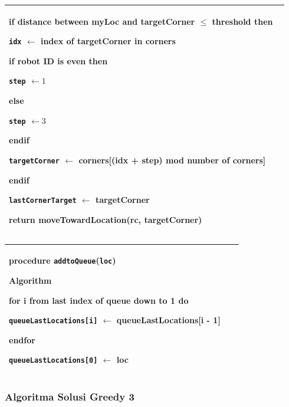 \documentclass{article}
\newenvironment{pseudobox}
{
\centering
\begin{longtable}{|p{0.94\linewidth}|}
\hline
}
{
\\ \hline
\end{longtable}
\vspace{0.05cm}
}
\begin{document}
\begin{enumerate}[label=\alph*.]
\begin{pseudobox}
\hspace*{1.5em}if distance between myLoc and targetCorner $\leq$ threshold then

\hspace*{3em}\texttt{idx} $\leftarrow$ index of targetCorner in corners

\hspace*{3em}if robot ID is even then

\hspace*{4.5em}\texttt{step} $\leftarrow 1$

\hspace*{3em}else

\hspace*{4.5em}\texttt{step} $\leftarrow 3$

\hspace*{3em}endif

\hspace*{3em}\texttt{targetCorner} $\leftarrow$ corners[(idx + step) mod number of corners]

\hspace*{1.5em}endif

\hspace*{1.5em}\texttt{lastCornerTarget} $\leftarrow$ targetCorner

\hspace*{1.5em}return moveTowardLocation(rc, targetCorner)

\end{pseudobox}

\begin{pseudobox}
\textbf{procedure \texttt{addtoQueue}(\texttt{loc})}

\textbf{Algorithm}

\hspace*{1.5em}for i from last index of queue down to 1 do

\hspace*{3em}\texttt{queueLastLocations[i]} $\leftarrow$ queueLastLocations[i - 1]

\hspace*{1.5em}endfor

\hspace*{1.5em}\texttt{queueLastLocations[0]} $\leftarrow$ loc
\end{pseudobox}

\subsubsection{Algoritma Solusi Greedy 3}


\end{enumerate}
\end{document}
